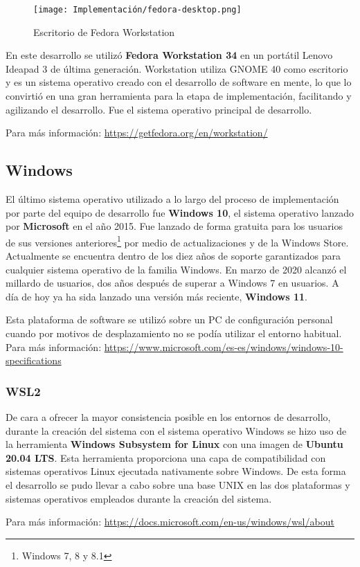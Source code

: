 \begin{figure}[H]
    \centering
    \texttt{[image: Implementación/fedora-desktop.png]}
    \caption{Escritorio de Fedora Workstation}
    \label{fig:fedora}
\end{figure}

\newpage
En este desarrollo se utilizó \textbf{Fedora Workstation 34} en un portátil Lenovo Ideapad 3 de última generación. Workstation utiliza GNOME 40 como escritorio y es un sistema operativo creado con el desarrollo de software en mente, lo que lo convirtió en una gran herramienta para la etapa de implementación, facilitando y agilizando el desarrollo. Fue el sistema operativo principal de desarrollo.

Para más información: \href{https://getfedora.org/en/workstation/}{https://getfedora.org/en/workstation/}

\subsection{Windows}

El último sistema operativo utilizado a lo largo del proceso de implementación por parte del equipo de desarrollo fue \textbf{Windows 10}, el sistema operativo lanzado por \textbf{Microsoft} en el año 2015. Fue lanzado de forma gratuita para los usuarios de sus versiones anteriores\footnote{Windows 7, 8 y 8.1} por medio de actualizaciones y de la Windows Store. Actualmente se encuentra dentro de los diez años de soporte garantizados para cualquier sistema operativo de la familia Windows. En marzo de 2020 alcanzó el millardo de usuarios\cite{warren2020}, dos años después de superar a Windows 7 en usuarios. A día de hoy ya ha sida lanzado una versión más reciente, \textbf{Windows 11}.

Esta plataforma de software se utilizó sobre un PC de configuración personal cuando por motivos de desplazamiento no se podía utilizar el entorno habitual. Para más información: \href{https://www.microsoft.com/es-es/windows/windows-10-specifications}{https://www.microsoft.com/es-es/windows/windows-10-specifications}

\subsubsection{WSL2}

De cara a ofrecer la mayor consistencia posible en los entornos de desarrollo, durante la creación del sistema con el sistema operativo Windows se hizo uso de la herramienta \textbf{Windows Subsystem for Linux} con una imagen de \textbf{Ubuntu 20.04 LTS}. Esta herramienta proporciona una capa de compatibilidad con sistemas operativos Linux ejecutada nativamente sobre Windows. De esta forma el desarrollo se pudo llevar a cabo sobre una base UNIX en las dos plataformas y sistemas operativos empleados durante la creación del sistema.

Para más información: \href{https://docs.microsoft.com/en-us/windows/wsl/about}{https://docs.microsoft.com/en-us/windows/wsl/about}
